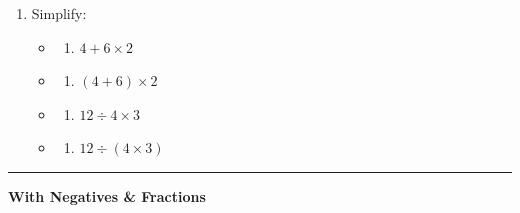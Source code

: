 \documentclass[
  letterpaper,
  DIV=11,
  numbers=noendperiod]{scrreprt}
\providecommand{\tightlist}{%
  \setlength{\itemsep}{0pt}\setlength{\parskip}{0pt}}
\begin{document}
\begin{enumerate}
\def\labelenumi{\arabic{enumi}.}
\item
  Simplify:

  \begin{itemize}
  \tightlist
  \item
    \begin{enumerate}
    \def\labelenumii{\alph{enumii}.}
    \tightlist
    \item
      \(4 + 6 \times 2\)
    \end{enumerate}
  \item
    \begin{enumerate}
    \def\labelenumii{\alph{enumii}.}
    \setcounter{enumii}{1}
    \tightlist
    \item
      \((4 + 6) \times 2\)
    \end{enumerate}
  \item
    \begin{enumerate}
    \def\labelenumii{\alph{enumii}.}
    \setcounter{enumii}{2}
    \tightlist
    \item
      \(12 \div 4 \times 3\)
    \end{enumerate}
  \item
    \begin{enumerate}
    \def\labelenumii{\alph{enumii}.}
    \setcounter{enumii}{3}
    \tightlist
    \item
      \(12 \div (4 \times 3)\)
    \end{enumerate}
  \end{itemize}
\end{enumerate}

\begin{center}\rule{0.5\linewidth}{0.5pt}\end{center}

\textbf{With Negatives \& Fractions}
\end{document}
